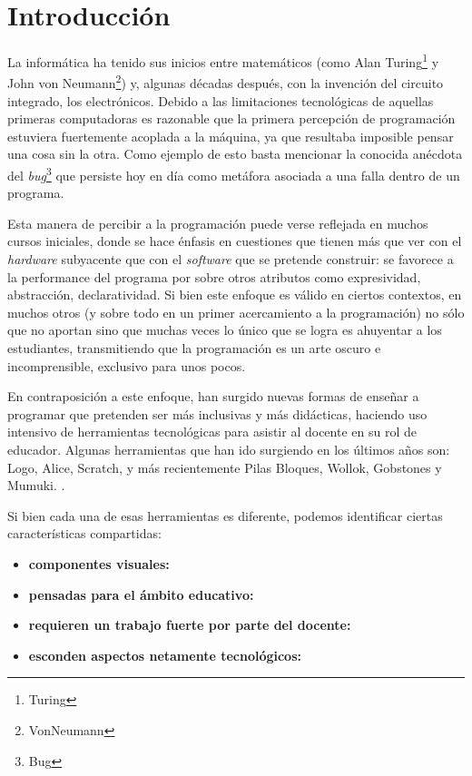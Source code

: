 
\newcommand{\caracteristica}[1]{\item \textbf{#1:}}

\section{Introducción}
La informática ha tenido sus inicios entre matemáticos (como Alan Turing\footnote{Turing} y John von Neumann\footnote{VonNeumann}) y, algunas décadas después, con la invención del circuito integrado, los electrónicos. Debido a las limitaciones tecnológicas de aquellas primeras computadoras es razonable que la primera percepción de programación estuviera fuertemente acoplada a la máquina, ya que resultaba imposible pensar una cosa sin la otra. Como ejemplo de esto basta mencionar la conocida anécdota del \textit{bug}\footnote{Bug} que persiste hoy en día como metáfora asociada a una falla dentro de un programa.


Esta manera de percibir a la programación puede verse reflejada en muchos cursos iniciales, donde se hace énfasis en cuestiones que tienen más que ver con el \textit{hardware} subyacente que con el \textit{software} que se pretende construir: se favorece a la performance del programa por sobre otros atributos como expresividad, abstracción, declaratividad. Si bien este enfoque es válido en ciertos contextos, en muchos otros (y sobre todo en un primer acercamiento a la programación) no sólo que no aportan sino que muchas veces lo único que se logra es ahuyentar a los estudiantes, transmitiendo que la programación es un arte oscuro e incomprensible, exclusivo para unos pocos.

En contraposición a este enfoque, han surgido nuevas formas de enseñar a programar que pretenden ser más inclusivas y más didácticas, haciendo uso intensivo de herramientas tecnológicas para asistir al docente en su rol de educador. Algunas herramientas que han ido surgiendo en los últimos años son: Logo, Alice, Scratch, y más recientemente Pilas Bloques, Wollok, Gobstones y Mumuki. .

Si bien cada una de esas herramientas es diferente, podemos identificar ciertas características compartidas:
\begin{itemize}
  \caracteristica{componentes visuales}
  \caracteristica{pensadas para el ámbito educativo}
  \caracteristica{requieren un trabajo fuerte por parte del docente}
  \caracteristica{esconden aspectos netamente tecnológicos}
\end{itemize}

